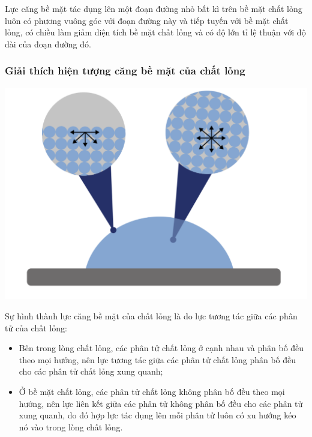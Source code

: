 Lực căng bề mặt tác dụng lên một đoạn đường nhỏ bất kì trên bề mặt chất lỏng luôn có phương vuông góc với đoạn đường này và tiếp tuyến với bề mặt chất lỏng, có chiều làm giảm diện tích bề mặt chất lỏng và có độ lớn tỉ lệ thuận với độ dài của đoạn đường đó.

\subsubsection{Giải thích hiện tượng căng bề mặt của chất lỏng}
\begin{center}
	\includegraphics[scale=0.2]{../figs/VN10-PH-46-L-0341-2.png}
\end{center}

Sự hình thành lực căng bề mặt của chất lỏng là do lực tương tác giữa các phân tử của chất lỏng:
\begin{itemize}
	\item Bên trong lòng chất lỏng, các phân tử chất lỏng ở cạnh nhau và phân bố đều theo mọi hướng, nên lực tương tác giữa các phân tử chất lỏng phân bố đều cho các phân tử chất lỏng xung quanh;
	\item Ở bề mặt chất lỏng, các phân tử chất lỏng không phân bố đều theo mọi hướng, nên lực liên kết giữa các phân tử không phân bố đều cho các phân tử xung quanh, do đó hợp lực tác dụng lên mỗi phân tử luôn có xu hướng kéo nó vào trong lòng chất lỏng. 
\end{itemize}
